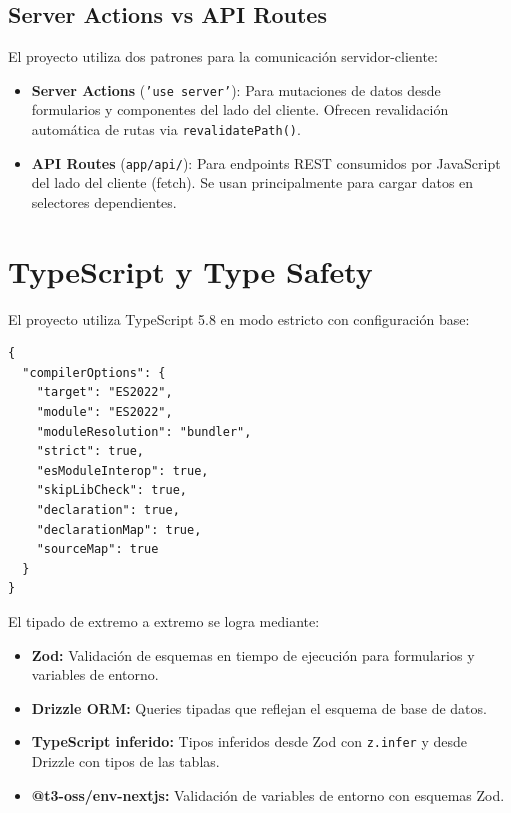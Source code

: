 \subsection{Server Actions vs API Routes}

El proyecto utiliza dos patrones para la comunicaci\'on servidor-cliente:

\begin{itemize}[leftmargin=*]
    \item \textbf{Server Actions} (\texttt{'use server'}): Para mutaciones de
          datos desde formularios y componentes del lado del cliente. Ofrecen
          revalidaci\'on autom\'atica de rutas via \texttt{revalidatePath()}.
    \item \textbf{API Routes} (\texttt{app/api/}): Para endpoints REST
          consumidos por JavaScript del lado del cliente (fetch). Se usan
          principalmente para cargar datos en selectores dependientes.
\end{itemize}

\section{TypeScript y Type Safety}

El proyecto utiliza TypeScript 5.8 en modo estricto con configuraci\'on base:

\begin{lstlisting}[style=json, caption=tsconfig.base.json (extracto)]
{
  "compilerOptions": {
    "target": "ES2022",
    "module": "ES2022",
    "moduleResolution": "bundler",
    "strict": true,
    "esModuleInterop": true,
    "skipLibCheck": true,
    "declaration": true,
    "declarationMap": true,
    "sourceMap": true
  }
}
\end{lstlisting}

El tipado de extremo a extremo se logra mediante:

\begin{itemize}[leftmargin=*]
    \item \textbf{Zod:} Validaci\'on de esquemas en tiempo de ejecuci\'on
          para formularios y variables de entorno.
    \item \textbf{Drizzle ORM:} Queries tipadas que reflejan el esquema de
          base de datos.
    \item \textbf{TypeScript inferido:} Tipos inferidos desde Zod con
          \texttt{z.infer} y desde Drizzle con tipos de las tablas.
    \item \textbf{@t3-oss/env-nextjs:} Validaci\'on de variables de entorno
          con esquemas Zod.
\end{itemize}
